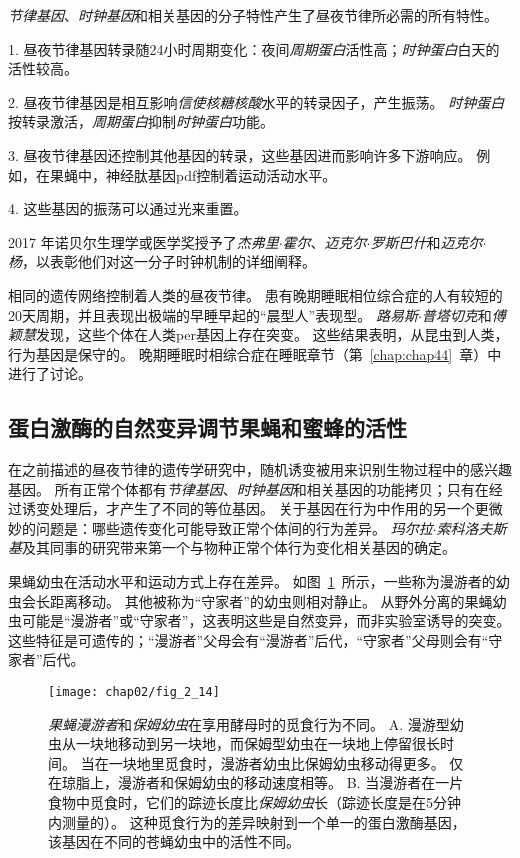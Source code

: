 \textit{节律基因}、\textit{时钟基因}和相关基因的分子特性产生了昼夜节律所必需的所有特性。

1. 昼夜节律基因转录随24小时周期变化：夜间\textit{周期蛋白}活性高；\textit{时钟蛋白}白天的活性较高。


2. 昼夜节律基因是相互影响\textit{信使核糖核酸}水平的转录因子，产生振荡。
\textit{时钟蛋白}按转录激活，\textit{周期蛋白}抑制\textit{时钟蛋白}功能。


3. 昼夜节律基因还控制其他基因的转录，这些基因进而影响许多下游响应。
例如，在果蝇中，神经肽基因pdf控制着运动活动水平。


4. 这些基因的振荡可以通过光来重置。



2017 年诺贝尔生理学或医学奖授予了\textit{杰弗里$\cdot$霍尔}、\textit{迈克尔$\cdot$罗斯巴什}和\textit{迈克尔$\cdot$杨}，以表彰他们对这一分子时钟机制的详细阐释。


相同的遗传网络控制着人类的昼夜节律。
患有晚期睡眠相位综合症的人有较短的20天周期，并且表现出极端的早睡早起的“晨型人”表现型。
\textit{路易斯$\cdot$普塔切克}和\textit{傅颖慧}发现，这些个体在人类per基因上存在突变。
这些结果表明，从昆虫到人类，行为基因是保守的。
晚期睡眠时相综合症在睡眠章节（第~\ref{chap:chap44}~章）中进行了讨论。



\subsection{蛋白激酶的自然变异调节果蝇和蜜蜂的活性}

在之前描述的昼夜节律的遗传学研究中，随机诱变被用来识别生物过程中的感兴趣基因。
所有正常个体都有\textit{节律基因}、\textit{时钟基因}和相关基因的功能拷贝；只有在经过诱变处理后，才产生了不同的等位基因。
关于基因在行为中作用的另一个更微妙的问题是：哪些遗传变化可能导致正常个体间的行为差异。
\textit{玛尔拉$\cdot$索科洛夫斯基}及其同事的研究带来第一个与物种正常个体行为变化相关基因的确定。




果蝇幼虫在活动水平和运动方式上存在差异。
如图~\ref{fig:2_14}~所示，一些称为漫游者的幼虫会长距离移动。
其他被称为“守家者”的幼虫则相对静止。
从野外分离的果蝇幼虫可能是“漫游者”或“守家者”，这表明这些是自然变异，而非实验室诱导的突变。
这些特征是可遗传的；“漫游者”父母会有“漫游者”后代，“守家者”父母则会有“守家者”后代。


\begin{figure}[htbp]
	\centering
	\texttt{[image: chap02/fig\_2\_14]}
	\caption{\textit{果蝇漫游者}和\textit{保姆幼虫}在享用酵母时的觅食行为不同\cite{sokolowski2001drosophila}。
		A. 漫游型幼虫从一块地移动到另一块地，而保姆型幼虫在一块地上停留很长时间。
		当在一块地里觅食时，漫游者幼虫比保姆幼虫移动得更多。
		仅在琼脂上，漫游者和保姆幼虫的移动速度相等。
		B. 当漫游者在一片食物中觅食时，它们的踪迹长度比\textit{保姆幼虫}长（踪迹长度是在5分钟内测量的）。
		这种觅食行为的差异映射到一个单一的蛋白激酶基因，该基因在不同的苍蝇幼虫中的活性不同。}
	\label{fig:2_14}
\end{figure}


